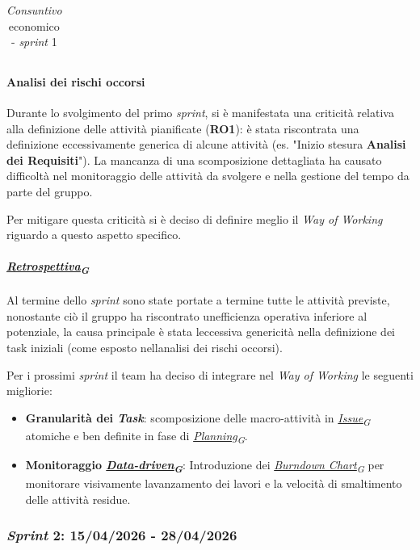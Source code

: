 \documentclass[12pt, a4paper]{article}
\newcommand{\urlglossario}{https://skynetunigroup.github.io/Code_Guardian/Documentazione/RTB/glossario_v1.0.0.pdf} %
\newcommand{\glo}[2]{\href{\urlglossario\#nameddest=#2}{#1\textsubscript{G}}}
\begin{document}
{\begin{table}[H]
{\begin{tabularx}{1.09\textwidth}{|X|c|c|c|c|c|c|c|}
        \end{tabularx}
        }
    \caption{\textit{Consuntivo} economico - \textit{sprint} 1}
\end{table}

\paragraph{Analisi dei rischi occorsi}

Durante lo svolgimento del primo \textit{sprint}, si è manifestata una
criticità relativa alla definizione delle attività pianificate
(\textbf{RO1}): è stata riscontrata una definizione eccessivamente
generica di alcune attività (es.
"Inizio stesura \textbf{Analisi dei Requisiti}"). La mancanza di una scomposizione dettagliata ha causato
difficoltà nel monitoraggio delle attività da svolgere e nella gestione
del tempo da parte del gruppo.

Per mitigare questa criticità si è deciso di definire meglio il
\textit{Way of Working} riguardo a questo aspetto specifico.
\paragraph{\textit{\glo{Retrospettiva}{retrospettiva}}}

Al termine dello \textit{sprint} sono state portate a termine tutte le
attività previste, nonostante ciò il gruppo ha riscontrato
un\textquotesingle efficienza operativa inferiore al potenziale, la
causa principale è stata l\textquotesingle eccessiva genericità nella
definizione dei task iniziali (come esposto nell\textquotesingle analisi
dei rischi occorsi).

Per i prossimi \textit{sprint} il team ha deciso di integrare nel \textit{Way of Working} le seguenti migliorie:

\begin{itemize}
\item
  \textbf{Granularità dei \textit{Task}}: scomposizione delle
  macro-attività in \textit{\glo{Issue}{issue}} atomiche e ben definite in fase di
  \textit{\glo{Planning}{planning}}.
\item
  \textbf{Monitoraggio \textit{\glo{Data-driven}{data-driven}}}: Introduzione dei
  \textit{\glo{Burndown Chart}{burndown-chart}} per monitorare visivamente
  l\textquotesingle avanzamento dei lavori e la velocità di smaltimento
  delle attività residue.
\end{itemize}

\subsubsection{\textit{Sprint} 2: 15/04/2026 - 28/04/2026}

}
\end{document}
